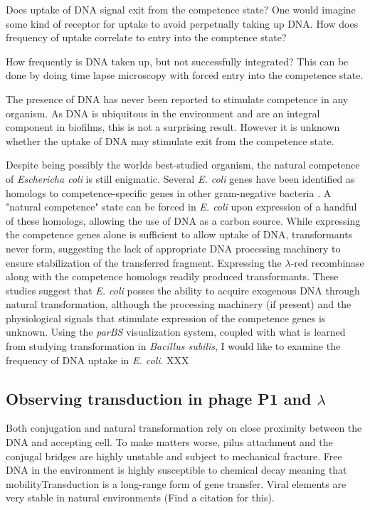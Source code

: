 Does uptake of DNA signal exit from the competence state? One would imagine some
kind of receptor for uptake to avoid perpetually taking up DNA.	How does
frequency of uptake correlate to entry into the comptence state? 

How frequently is DNA taken up, but not successfully integrated? This can be
done by doing time lapse microscopy with forced entry into the competence state.

The presence of DNA has never been reported to stimulate competence in any
organism. As DNA is ubiquitous in the environment\cite{DellAnno:2002uw} and are
an integral component in biofilms\cite{Tang:2013kj}, this is not a surprising
result. However it is unknown whether the uptake of DNA may stimulate exit from
the competence state. 

Despite being possibly the worlds best-studied organism, the natural competence
of \textit{Eschericha coli} is still enigmatic. Several \textit{E. coli} genes
have been identified as homologs to competence-specific genes in other
gram-negative bacteria \cite{Averhoff:2003ex, Chen:2004iya}. A "natural
competence" state can be forced in \textit{E. coli} upon expression of a handful
of these homologs, allowing the use of DNA as a carbon
source\cite{Palchevskiy:2006kqb, Finkel:2001ge}. While expressing the competence
genes alone is sufficient to allow uptake of DNA, transformants never form,
suggesting the lack of appropriate DNA processing machinery to ensure
stabilization of the transferred fragment. Expressing the $\lambda$-red
recombinase along with the competence homologs readily produced
transformants\cite{Sinha:2012eha}. These studies suggest that \textit{E. coli}
posses the ability to acquire exogenous DNA through natural transformation,
although the processing machinery (if present) and the physiological signals
that stimulate expression of the competence genes is unknown. Using the
\textit{parBS} visualization system, coupled with what is learned from studying
transformation in \textit{Bacillus subilis}, I would like to examine the
frequency of DNA uptake in \textit{E. coli}. XXX



\subsection*{Observing transduction in phage P1 and $\lambda$}
Both conjugation and natural transformation rely on close proximity between the
DNA and accepting cell. To make matters worse, pilus attachment and the conjugal
bridges are highly unstable and subject to mechanical fracture. Free DNA in the
environment is highly susceptible to chemical decay meaning that mobilityTransduction is a
long-range form of gene transfer.  Viral elements are very stable in natural
environments (Find a citation for this).

